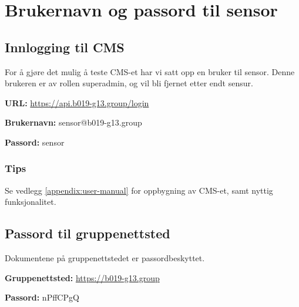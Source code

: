 \cleardoublepage
\chapter{Brukernavn og passord til sensor}
\label{appendix:login-cms} 

\section{Innlogging til CMS}
For å gjøre det mulig å teste CMS-et har vi satt opp en bruker til sensor. Denne brukeren er av rollen superadmin, og vil bli fjernet etter endt sensur.

\textbf{URL:}
\url{https://api.b019-g13.group/login}

\textbf{Brukernavn:}
sensor@b019-g13.group

\textbf{Passord:}
sensor

\subsection{Tips}
Se vedlegg \ref{appendix:user-manual} for oppbygning av CMS-et, samt nyttig funksjonalitet.

\section{Passord til gruppenettsted}
Dokumentene på gruppenettstedet er passordbeskyttet.

\textbf{Gruppenettsted:}
\url{https://b019-g13.group}

\textbf{Passord:}
nPffCPgQ
